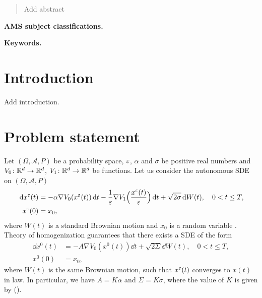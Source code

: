 \documentclass[10pt]{article}
\begin{document}
\maketitle	

\begin{abstract} Add abstract
\end{abstract}

\textbf{AMS subject classifications.} 

\textbf{Keywords.} 

\normalsize
\section{Introduction}

Add introduction.

\section{Problem statement}

Let $(\Omega, \mathcal A, P)$ be a probability space, $\varepsilon$, $\alpha$ and $\sigma$ be positive real numbers and $V_0 \colon \mathbb{R}^d \to \mathbb{R}^d$, $V_1 \colon \mathbb{R}^d \to \mathbb{R}^d$ be  functions. Let us consider the autonomous SDE on $(\Omega, \mathcal A, P)$
\begin{equation}\label{eq:SDE_MS}
\begin{aligned}
	\,\mathrm{d} x^\varepsilon(t) &= -\alpha \nabla V_0(x^\varepsilon(t)) \,\mathrm{d} t - \frac{1}{\varepsilon}\nabla V_1\Big(\frac{x^\varepsilon(t)}{\varepsilon}\Big) \,\mathrm{d} t + \sqrt{2\sigma} \,\mathrm{d} W(t), \quad 0 < t \leq T, \\
	x^\varepsilon(0) &= x_0,
\end{aligned}
\end{equation}
where $W(t)$ is a standard Brownian motion and $x_0$ is a random variable . Theory of homogenization guarantees that there exists a SDE of the form
\begin{equation}\label{eq:SDE_HOM}
\begin{aligned}
	\dd x^0(t) &= -A \nabla V_0(x^0(t)) \dd t + \sqrt{2\Sigma} \dd W(t), \quad 0 < t \leq T, \\
	x^0(0) &= x_0,
\end{aligned}
\end{equation}
where $W(t)$ is the same Brownian motion, such that $x^\varepsilon(t)$ converges to $x(t)$ in law. In particular, we have $A = K\alpha$ and $\Sigma = K\sigma$, where the value of $K$ is given by ().
\end{document}
